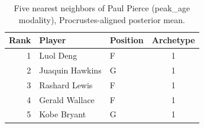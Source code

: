 \begin{table}[htbp]
  \centering\small
  \begin{tabular}{rllc}
    \toprule
    Rank & Player & Position & Archetype \\
    \midrule
    1 & Luol Deng & F & 1 \\
    2 & Juaquin Hawkins & G & 1 \\
    3 & Rashard Lewis & F & 1 \\
    4 & Gerald Wallace & F & 1 \\
    5 & Kobe Bryant & G & 1 \\
    \bottomrule
  \end{tabular}
  \caption{Five nearest neighbors of Paul Pierce (peak_age modality), Procrustes-aligned posterior mean.}
  \label{tab:Paul_Pierce_neighbors_peak_age}
\end{table}

